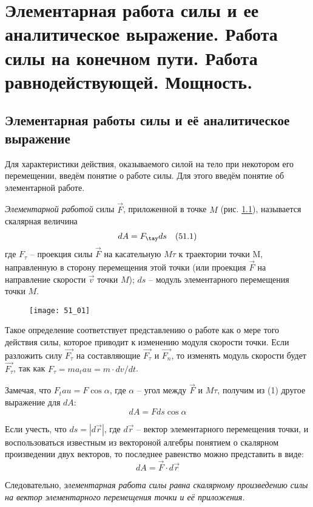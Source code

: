 \chapter{Элементарная работа силы и ее аналитическое выражение. Работа силы на
конечном пути. Работа равнодействующей. Мощность.}

\section{Элементарная работы силы и её аналитическое выражение}
Для характеристики действия, оказываемого силой на тело при некотором его 
перемещении, введём понятие о работе силы. Для этого введём понятие об 
элементарной работе.

\emph{Элементарной работой} силы \( \vec{F} \), приложенной в точке 
\( M \) (рис. \ref{pic51_01}), называется скалярная величина
\[ dA = F_\tay ds \quad (51.1) \]
где \( F_\tau \) -- проекция силы \( \vec{F} \) на касательную \( M\tau \) 
к траектории точки M, направленную в сторону перемещения этой точки 
(или проекция \( \vec{F} \) на направление скорости \( \vec{v} \) точки 
\( M \)); \( ds \) -- модуль элементарного перемещения точки \( M \).

\begin{figure}[h!]
    \texttt{[image: 51\_01]}\hfill
    \parbox{.47\textwidth}{\caption{} \label{pic51_01}}
\end{figure}

Такое определение соответствует представлению о работе как о мере того 
действия силы, которое приводит к изменению модуля скорости точки. Если 
разложить силу \( \vec{F_\tau} \) на составляющие \( \vec{F_\tau} \) и 
\( \vec{F_n} \), то изменять модуль скорости будет \( \vec{F_\tau} \), 
так как \( F_\tau = ma_tau = m\cdot dv/dt \).

Замечая, что \( F_tau = F\cos\alpha \), где \( \alpha \) -- угол между 
\( \vec{F} \) и \( M\tau \), получим из (1) другое выражение для \( dA \):
\[ dA = Fds\cos\alpha \]

Если учесть, что \( ds = |d\vec{r}| \), где \( d\vec{r} \) -- вектор 
элементарного перемещения точки, и воспользоваться известным из вектороной 
алгебры понятием о скалярном произведении двух векторов, то последнее 
равенство можно представить в виде:
\[ dA = \vec{F}\cdot d\vec{r} \]

Следовательно, \emph{элементарная работа силы равна скалярному произведению 
силы на вектор элементарного перемещения точки и её приложения.}

